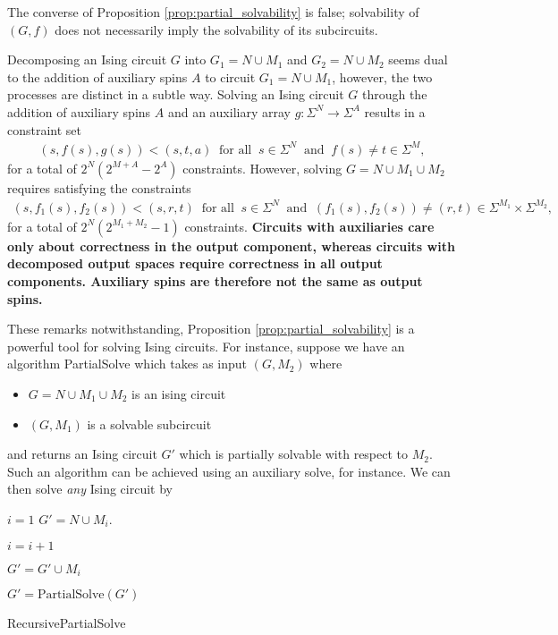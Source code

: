 \documentclass{article}
\begin{document}
\begin{rmk}
    The converse of Proposition \ref{prop:partial_solvability} is false; solvability of $(G,f)$ does not necessarily imply the solvability of its subcircuits.
\end{rmk}
\begin{rmk}
    Decomposing an Ising circuit $G$ into $G_1 = N \cup M_1$ and $G_2 = N \cup M_2$ seems dual to the addition of auxiliary spins $A$ to circuit $G_1 = N \cup M_1$, however, the two processes are distinct in a subtle way. Solving an Ising circuit $G$ through the addition of auxiliary spins $A$ and an auxiliary array $g:\Sigma^N \to \Sigma^A$ results in a constraint set
    \begin{align*}
        (s,f(s),g(s)) < (s,t,a) ~\text{ for all }~ s\in \Sigma^N ~\text{ and }~ f(s) \neq t\in \Sigma^M,
    \end{align*}
    for a total of $2^N(2^{M+A} - 2^A)$ constraints. However, solving $G = N \cup M_1 \cup M_2$ requires satisfying the constraints
    \begin{align*}
        (s,f_1(s),f_2(s)) < (s,r,t) ~\text{ for all }~ s\in \Sigma^N ~\text{ and }~ (f_1(s), f_2(s)) \neq (r,t) \in \Sigma^{M_1}\times \Sigma^{M_2},
    \end{align*}
    for a total of $2^N(2^{M_1 + M_2} - 1)$ constraints. \textbf{Circuits with auxiliaries care only about correctness in the output component, whereas circuits with decomposed output spaces require correctness in all output components. Auxiliary spins are therefore not the same as output spins.}
\end{rmk}

These remarks notwithstanding, Proposition \ref{prop:partial_solvability} is a powerful tool for solving Ising circuits. For instance, suppose we have an algorithm PartialSolve which takes as input $(G,M_2)$ where
\begin{itemize}
  \item $G = N\cup M_1 \cup M_2$ is an ising circuit
  \item $(G,M_1)$ is a solvable subcircuit
\end{itemize}
and returns an Ising circuit $G'$ which is partially solvable with respect to $M_2$. Such an algorithm can be achieved using an auxiliary solve, for instance. We can then solve \emph{any} Ising circuit by
\begin{algorithm}[!ht]
\DontPrintSemicolon
  
    $i = 1$
    $G' = N\cup M_i$.

  {
     $i = i + 1$

    $G' = G' \cup M_i$

    $G' = \text{PartialSolve}(G')$
  }
\caption{RecursivePartialSolve}
\end{algorithm}
\end{document}
